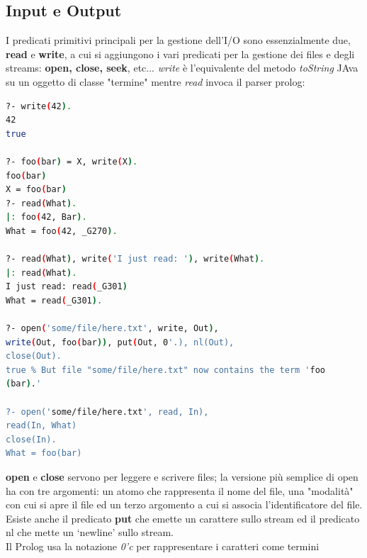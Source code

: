 \documentclass[a4paper,12pt, oneside]{book}
\begin{document}
\subsection{Input e Output}
I predicati primitivi principali per la gestione dell'I/O sono
essenzialmente due, \textbf{read} e \textbf{write}, a cui si aggiungono i vari predicati per la gestione dei files e degli streams: \textbf{open, close, seek}, etc...
\textit{write} è l'equivalente del metodo \textit{toString} JAva su un oggetto di classe "termine" mentre \textit{read} invoca il parser prolog:
\begin{shaded}
	\begin{lstlisting}[language=bash]
?- write(42).
42
true

?- foo(bar) = X, write(X).
foo(bar)
X = foo(bar)
?- read(What).
|: foo(42, Bar).
What = foo(42, _G270).

?- read(What), write('I just read: '), write(What).
|: read(What).
I just read: read(_G301)
What = read(_G301).

?- open('some/file/here.txt', write, Out),
write(Out, foo(bar)), put(Out, 0'.), nl(Out),
close(Out).
true % But file "some/file/here.txt" now contains the term 'foo
(bar).'

?- open('some/file/here.txt', read, In),
read(In, What)
close(In).
What = foo(bar)
\end{lstlisting}
\end{shaded}
\textbf{open} e \textbf{close} servono per leggere e scrivere files; la versione più semplice di open ha con tre argomenti: un atomo che rappresenta il nome del file, una "modalità" con cui si apre il file ed un terzo argomento a cui si associa l'identificatore del file.\\
Esiste anche il predicato \textbf{put} che emette un carattere sullo stream ed il predicato nl che mette un ‘newline' sullo stream.\\
Il Prolog usa la notazione \textit{0'c} per rappresentare i caratteri come termini
\end{document}
